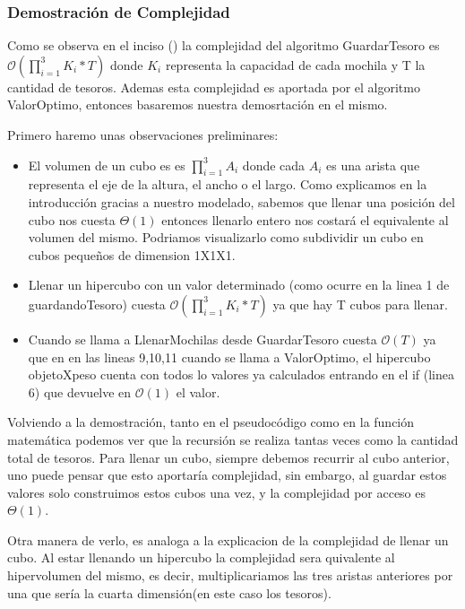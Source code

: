 \documentclass[spanish,12pt]{article}
\begin{document}
\subsubsection{Demostración de Complejidad}

Como se observa en el inciso () la complejidad del algoritmo GuardarTesoro es $\mathcal{O}(\prod_{i=1}^{3}K_{i} * T)$ donde $K_i$ representa la capacidad de cada mochila y T la cantidad de tesoros. Ademas esta complejidad es aportada por el algoritmo ValorOptimo, entonces basaremos nuestra demosrtación en el mismo.

Primero haremo unas observaciones preliminares:
\begin{itemize}

	\item El volumen de un cubo es es $\prod_{i=1}^{3}A_{i}$ donde cada $A_i$ es una arista que representa el eje de la altura, el ancho o el largo. Como explicamos en la introducción gracias a nuestro modelado, sabemos que llenar una posición del cubo nos cuesta $\Theta(1)$ entonces llenarlo entero nos costará el equivalente al volumen del mismo. Podriamos visualizarlo como subdividir un cubo en cubos pequeños de dimension 1X1X1.
	\item Llenar un hipercubo con un valor determinado (como ocurre en la linea 1 de guardandoTesoro) cuesta $\mathcal{O}(\prod_{i=1}^{3}K_{i} * T)$ ya que hay T cubos para llenar.
	\item Cuando se llama a LlenarMochilas desde GuardarTesoro cuesta $\mathcal{O}(T)$ ya que en en las lineas 9,10,11 cuando se llama a ValorOptimo, el hipercubo objetoXpeso cuenta con todos lo valores ya calculados entrando en el if (linea 6) que devuelve en $\mathcal{O}(1)$ el valor.
\end{itemize}

Volviendo a la demostración, tanto en el pseudocódigo como en la función matemática podemos ver que la recursión se realiza tantas veces como la cantidad total de tesoros. Para llenar un cubo, siempre debemos recurrir al cubo anterior, uno puede pensar que esto aportaría complejidad, sin embargo, al guardar estos valores solo construimos estos cubos una vez, y la complejidad por acceso es $\Theta(1)$.

Otra manera de verlo, es analoga a la explicacion de la complejidad de llenar un cubo. Al estar llenando un hipercubo la complejidad sera quivalente al hipervolumen del mismo, es decir, multiplicariamos las tres aristas anteriores por una que sería la cuarta dimensión(en este caso los tesoros).
\end{document}
